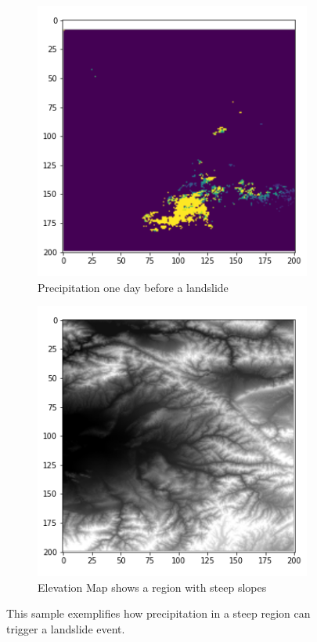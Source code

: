 \documentclass[sigconf, nonacm]{acmart}
\begin{document}
\begin{figure}[h]
\centering
\begin{subfigure}{.5\linewidth}
  \centering
  \includegraphics[width=.7\linewidth]{figures/Imagen_CUlia_1.png}
  \caption{\scriptsize Precipitation one day before a landslide}
  \label{fig:culia1}
\end{subfigure}%
\begin{subfigure}{.5\linewidth}
  \centering
  \includegraphics[width=.7\linewidth]{figures/imagen_culia_2.png}
  \caption{\scriptsize Elevation Map shows a region with steep slopes}
  \label{fig:culia2}
\end{subfigure}
\caption{\footnotesize This sample exemplifies how precipitation in a steep region can trigger a landslide event.}
\label{fig:culias}
\end{figure}
\end{document}
